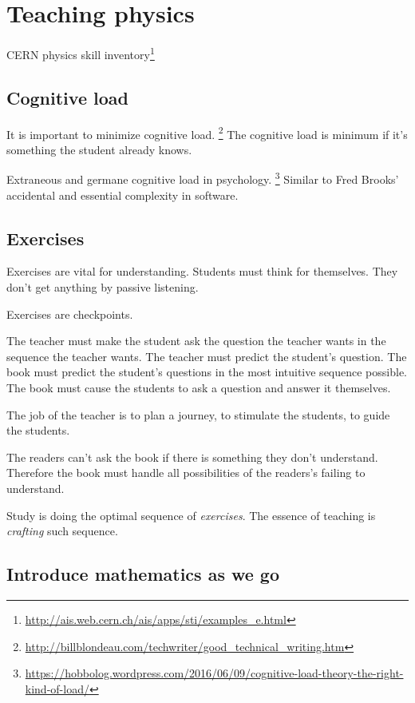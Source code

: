 \chapter{Teaching physics}

CERN physics skill inventory\footnote{\url{http://ais.web.cern.ch/ais/apps/sti/examples_e.html}}

\section{Cognitive load}

It is important to minimize cognitive load.%
\footnote{\url{http://billblondeau.com/techwriter/good_technical_writing.htm}}
The cognitive load is minimum if it's something the student already knows.

Extraneous and germane cognitive load in psychology.
\footnote{\url{https://hobbolog.wordpress.com/2016/06/09/cognitive-load-theory-the-right-kind-of-load/}}
Similar to Fred Brooks' accidental and essential complexity in software.

\section{Exercises}

Exercises are vital for understanding.
Students must think for themselves.
They don't get anything by passive listening.

Exercises are checkpoints.

The teacher must make the student ask the question the teacher wants in the sequence the teacher wants.
The teacher must predict the student's question.
The book must predict the student's questions in the most intuitive sequence possible.
The book must cause the students to ask a question and answer it themselves.

The job of the teacher is
to plan a journey,
to stimulate the students,
to guide the students.

The readers can't ask the book if there is something they don't understand.
Therefore the book must handle all possibilities of the readers's failing to understand.

Study is doing the optimal sequence of \emph{exercises}.
The essence of teaching is \emph{crafting} such sequence.

\section{Introduce mathematics as we go}

